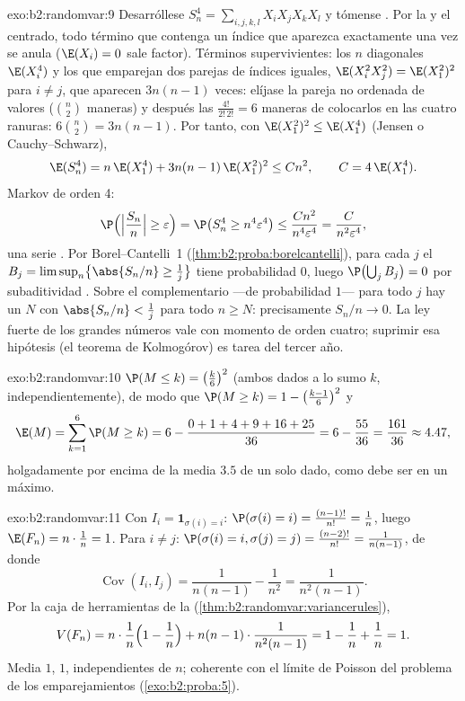 \begin{solution}{exo:b2:randomvar:9}
Desarróllese $S_n^4 = \sum_{i,j,k,l}X_iX_jX_kX_l$ y tómense
. Por la  y el centrado, todo término que
contenga un índice que aparezca exactamente una vez se anula
($\E(X_i) = 0$ sale factor). Términos supervivientes: los $n$
diagonales $\E(X_i^4)$ y los que emparejan dos parejas de índices
iguales, $\E(X_i^2X_j^2) = \E(X_1^2)^2$ para $i \neq j$, que aparecen
$3n(n-1)$ veces: elíjase la pareja no ordenada de valores
($\binom n2$ maneras) y después las $\frac{4!}{2!\,2!} = 6$ maneras
de colocarlos en las cuatro ranuras: $6\binom n2 = 3n(n-1)$. Por
tanto, con $\E(X_1^2)^2 \leq \E(X_1^4)$ (Jensen o Cauchy--Schwarz),
\[
\E(S_n^4) = n\,\E(X_1^4) + 3n(n-1)\,\E(X_1^2)^2
\leq C n^2,
\qquad C = 4\,\E(X_1^4) .
\]
Markov de orden 4:
\[
\P\Bigl(\Bigl|\frac{S_n}{n}\Bigr| \geq \varepsilon\Bigr)
= \P\bigl(S_n^4 \geq n^4\varepsilon^4\bigr)
\leq \frac{Cn^2}{n^4\varepsilon^4}
= \frac{C}{n^2\varepsilon^4} ,
\]
una serie . Por Borel--Cantelli~1
(\cref{thm:b2:proba:borelcantelli}), para cada $j$ el  $B_j =
\limsup_n\bigl\{\abs{S_n/n} \geq \frac1j\bigr\}$ tiene probabilidad
$0$, luego $\P\bigl(\bigcup_j B_j\bigr) = 0$ por subaditividad
. Sobre el complementario ---de probabilidad $1$--- para
todo $j$ hay un $N$ con $\abs{S_n/n} < \frac1j$ para todo $n \geq N$:
precisamente $S_n/n \to 0$. La ley fuerte de los grandes números vale
con momento de orden cuatro; suprimir esa hipótesis (el teorema de
Kolmogórov) es tarea del tercer año.
\end{solution}

\begin{solution}{exo:b2:randomvar:10}
$\P(M \leq k) = \bigl(\frac k6\bigr)^2$ (ambos dados a lo sumo $k$,
independientemente), de modo que $\P(M \geq k) = 1 -
\bigl(\frac{k-1}6\bigr)^2$ y
\[
\E(M) = \sum_{k=1}^6\P(M \geq k)
= 6 - \frac{0 + 1 + 4 + 9 + 16 + 25}{36}
= 6 - \frac{55}{36} = \frac{161}{36} \approx 4.47 ,
\]
holgadamente por encima de la media $3.5$ de un solo dado, como debe
ser en un máximo.
\end{solution}

\begin{solution}{exo:b2:randomvar:11}
Con $I_i = \mathbf 1_{\sigma(i) = i}$: $\P(\sigma(i) = i) =
\frac{(n-1)!}{n!} = \frac1n$, luego $\E(F_n) = n\cdot\frac1n = 1$.
Para $i \neq j$: $\P(\sigma(i) = i, \sigma(j) = j) =
\frac{(n-2)!}{n!} = \frac1{n(n-1)}$, de donde
\[
\operatorname{Cov}(I_i, I_j) = \frac1{n(n-1)} - \frac1{n^2}
= \frac{1}{n^2(n-1)} .
\]
Por la caja de herramientas de la 
(\cref{thm:b2:randomvar:variancerules}),
\[
V(F_n) = n\cdot\frac1n\Bigl(1 - \frac1n\Bigr)
+ n(n-1)\cdot\frac1{n^2(n-1)}
= 1 - \frac1n + \frac1n = 1 .
\]
Media $1$,  $1$, independientes de $n$; coherente con el
límite de Poisson del problema de los emparejamientos
(\cref{exo:b2:proba:5}).
\end{solution}

